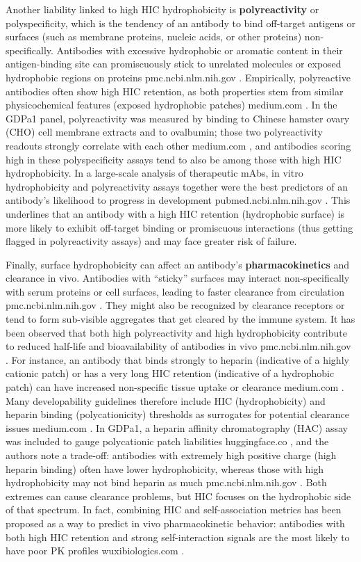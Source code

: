 \documentclass[12pt]{article}
\begin{document}
Another liability linked to high HIC hydrophobicity is \textbf{polyreactivity} or polyspecificity, which is the tendency of an antibody to bind off-target antigens or surfaces (such as membrane proteins, nucleic acids, or other proteins) non-specifically. Antibodies with excessive hydrophobic or aromatic content in their antigen-binding site can promiscuously stick to unrelated molecules or exposed hydrophobic regions on proteins
pmc.ncbi.nlm.nih.gov
. Empirically, polyreactive antibodies often show high HIC retention, as both properties stem from similar physicochemical features (exposed hydrophobic patches)
medium.com
. In the GDPa1 panel, polyreactivity was measured by binding to Chinese hamster ovary (CHO) cell membrane extracts and to ovalbumin; those two polyreactivity readouts strongly correlate with each other
medium.com
, and antibodies scoring high in these polyspecificity assays tend to also be among those with high HIC hydrophobicity. In a large-scale analysis of therapeutic mAbs, in vitro hydrophobicity and polyreactivity assays together were the best predictors of an antibody’s likelihood to progress in development
pubmed.ncbi.nlm.nih.gov
. This underlines that an antibody with a high HIC retention (hydrophobic surface) is more likely to exhibit off-target binding or promiscuous interactions (thus getting flagged in polyreactivity assays) and may face greater risk of failure.

Finally, surface hydrophobicity can affect an antibody’s \textbf{pharmacokinetics} and clearance in vivo. Antibodies with “sticky” surfaces may interact non-specifically with serum proteins or cell surfaces, leading to faster clearance from circulation
pmc.ncbi.nlm.nih.gov
. They might also be recognized by clearance receptors or tend to form sub-visible aggregates that get cleared by the immune system. It has been observed that both high polyreactivity and high hydrophobicity contribute to reduced half-life and bioavailability of antibodies in vivo
pmc.ncbi.nlm.nih.gov
. For instance, an antibody that binds strongly to heparin (indicative of a highly cationic patch) or has a very long HIC retention (indicative of a hydrophobic patch) can have increased non-specific tissue uptake or clearance
medium.com
. Many developability guidelines therefore include HIC (hydrophobicity) and heparin binding (polycationicity) thresholds as surrogates for potential clearance issues
medium.com
. In GDPa1, a heparin affinity chromatography (HAC) assay was included to gauge polycationic patch liabilities
huggingface.co
, and the authors note a trade-off: antibodies with extremely high positive charge (high heparin binding) often have lower hydrophobicity, whereas those with high hydrophobicity may not bind heparin as much
pmc.ncbi.nlm.nih.gov
. Both extremes can cause clearance problems, but HIC focuses on the hydrophobic side of that spectrum. In fact, combining HIC and self-association metrics has been proposed as a way to predict in vivo pharmacokinetic behavior: antibodies with both high HIC retention and strong self-interaction signals are the most likely to have poor PK profiles
wuxibiologics.com
.
\end{document}
